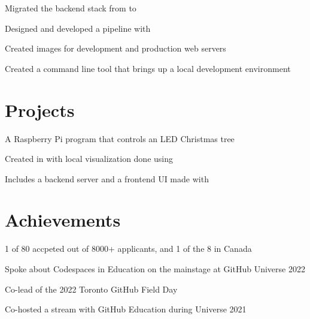 \documentclass[]{deedy-resume-openfont}
\begin{document}
\begin{minipage}[t]{0.66\textwidth}
\begin{tightemize}
\item Migrated the backend stack from to 

\item Designed and developed a  pipeline with 

\item Created images for development and production web servers

\item Created a command line tool that brings up a local development environment

\end{tightemize}
\sectionsep

\section{Projects}

\begin{tightemize}

\item A Raspberry Pi program that controls an LED Christmas tree

\item Created in with local visualization done using 

\item Includes a backend server and a frontend UI made with 

\end{tightemize}
\sectionsep

\section{Achievements}

\begin{tightemize}
\item 1 of 80 accpeted out of 8000+ applicants, and 1 of the 8 in Canada
\item Spoke about Codespaces in Education on the mainstage at GitHub Universe 2022
\item Co-lead of the 2022 Toronto GitHub Field Day
\item Co-hosted a stream with GitHub Education during Universe 2021
\end{tightemize}
\sectionsep


\end{minipage}
\end{document}
